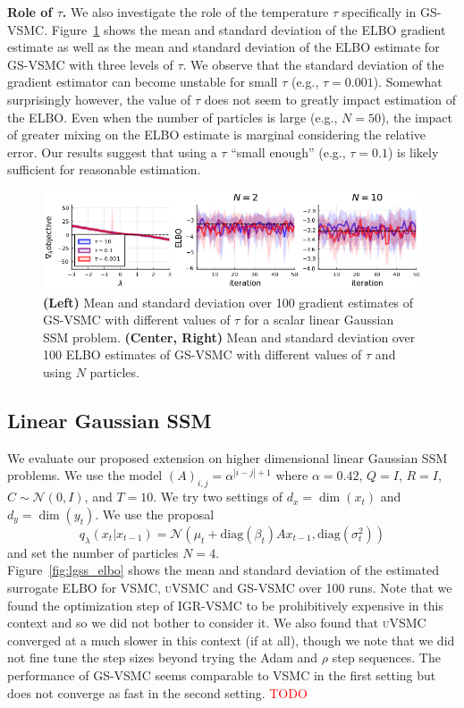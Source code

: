 \documentclass[12pt]{article}
\newcommand{\todo}{\textcolor{red}{TODO}}
\newcommand{\vsmc}{\textsc{VSMC}\xspace}
\newcommand{\uvsmc}{\textsc{uVSMC}\xspace}
\newcommand{\gsvsmc}{\textsc{GS-VSMC}\xspace}
\newcommand{\igrvsmc}{\textsc{IGR-VSMC}\xspace}
\newcommand{\elbo}{\textsc{ELBO}\xspace}
\newcommand{\ssm}{\textsc{SSM}\xspace}
\begin{document}
\textbf{Role of $\tau$.} We also investigate the role of the temperature $\tau$ specifically in \gsvsmc. Figure~\ref{fig:tau_plots} shows the mean and standard deviation of the \elbo gradient estimate as well as the mean and standard deviation of the \elbo estimate for \gsvsmc with three levels of $\tau$. We observe that the standard deviation of the gradient estimator can become unstable for small $\tau$ (e.g., $\tau=0.001$). Somewhat surprisingly however, the value of $\tau$ does not seem to greatly impact estimation of the \elbo. Even when the number of particles is large (e.g., $N=50$), the impact of greater mixing on the \elbo estimate is marginal considering the relative error. Our results suggest that using a $\tau$ ``small enough'' (e.g., $\tau=0.1$) is likely sufficient for reasonable estimation.

\begin{figure}[t]
\centering
\includegraphics[width=\textwidth]{figures/tau_plots.png}
\caption{\textbf{(Left)} Mean and standard deviation over 100 gradient estimates of \gsvsmc with different values of $\tau$ for a scalar linear Gaussian \ssm problem. \textbf{(Center, Right)} Mean and standard deviation over 100 \elbo estimates of \gsvsmc with different values of $\tau$ and using $N$ particles.}
\label{fig:tau_plots}
\end{figure}

\subsection{Linear Gaussian \ssm}

We evaluate our proposed extension on higher dimensional linear Gaussian \ssm problems. We use the model $(A)_{i,j}=\alpha^{|i-j|+1}$ where $\alpha=0.42$, $Q=I$, $R=I$, $C\sim\mathcal{N}(0,I)$, and $T=10$. We try two settings of $d_x=\dim(x_t)$ and $d_y=\dim(y_t)$. We use the proposal
\[
q_\lambda(x_t|x_{t-1}) = \mathcal{N}\left(\mu_t+\mathrm{diag}(\beta_t)Ax_{t-1},\mathrm{diag}(\sigma_t^2)\right)
\]
and set the number of particles $N=4$.
\\

Figure~\ref{fig:lgss_elbo} shows the mean and standard deviation of the estimated surrogate \elbo for \vsmc, \uvsmc and \gsvsmc over 100 runs. Note that we found the optimization step of \igrvsmc to be prohibitively expensive in this context and so we did not bother to consider it. We also found that \uvsmc converged at a much slower in this context (if at all), though we note that we did not fine tune the step sizes beyond trying the Adam and $\rho$ step sequences. The performance of \gsvsmc seems comparable to \vsmc in the first setting but does not converge as fast in the second setting. \todo
\end{document}

